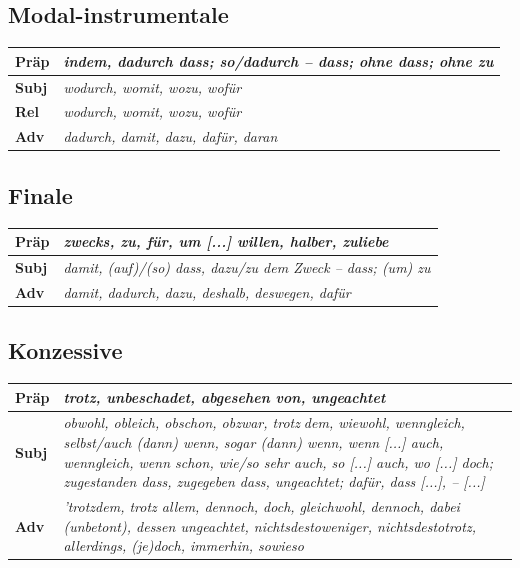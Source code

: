 \documentclass[UTF8]{report}
\begin{document}
\subsection{Modal-instrumentale}
\begin{longtable}{|>{\raggedright\arraybackslash}p{1cm}|>{\raggedright\arraybackslash}p{12cm}|}

\hline
\textbf{Präp} & \textit{indem, dadurch dass; so/dadurch -- dass; ohne dass; ohne zu} \\
\hline
\textbf{Subj} & \textit{wodurch, womit, wozu, wofür} \\
\hline
\textbf{Rel} & \textit{wodurch, womit, wozu, wofür} \\
\hline
\textbf{Adv} & \textit{dadurch, damit, dazu, dafür, daran} \\
\hline

\end{longtable}


\subsection{Finale}
\begin{longtable}{|>{\raggedright\arraybackslash}p{1cm}|>{\raggedright\arraybackslash}p{12cm}|}

\hline
\textbf{Präp} & \textit{zwecks, zu, für, um [...] willen, halber, zuliebe} \\
\hline
\textbf{Subj} & \textit{damit, (auf)/(so) dass, dazu/zu dem Zweck -- dass; (um) zu} \\
\hline
\textbf{Adv} & \textit{damit, dadurch, dazu, deshalb, deswegen, dafür} \\
\hline

\end{longtable}

\subsection{Konzessive}
\begin{longtable}{|>{\raggedright\arraybackslash}p{1cm}|>{\raggedright\arraybackslash}p{12cm}|}

\hline
\textbf{Präp} & \textit{trotz, unbeschadet, abgesehen von, ungeachtet} \\
\hline
\textbf{Subj} & \textit{obwohl, obleich, obschon, obzwar, trotz􏰁dem, wiewohl, wenngleich, selbst/auch (dann) wenn, sogar (dann) wenn, wenn [...] auch, wenngleich, wenn schon, wie/so sehr auch, so [...] auch, wo [...] doch; zugestanden dass, zugegeben dass, ungeachtet; dafür, dass [...], -- [...]} \\
\hline
\textbf{Adv} & \textit{'trotzdem, trotz allem, dennoch, doch, gleichwohl, dennoch, dabei (unbetont), dessen ungeachtet, nichtsdestoweniger, nichtsdestotrotz, allerdings, (je)doch, immerhin, sowieso} \\
\hline

\end{longtable}
\end{document}
